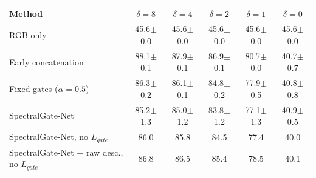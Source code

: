 \begin{tabular}{lccccc}
\toprule
Method & $\delta=8$ & $\delta=4$ & $\delta=2$ & $\delta=1$ & $\delta=0$ \\
\midrule
RGB only & 45.6$\pm$0.0 & 45.6$\pm$0.0 & 45.6$\pm$0.0 & 45.6$\pm$0.0 & 45.6$\pm$0.0 \\
Early concatenation & 88.1$\pm$0.1 & 87.9$\pm$0.1 & 86.9$\pm$0.1 & 80.7$\pm$0.0 & 40.7$\pm$0.7 \\
Fixed gates ($\alpha=0.5$) & 86.3$\pm$0.2 & 86.1$\pm$0.1 & 84.8$\pm$0.2 & 77.9$\pm$0.5 & 40.8$\pm$0.8 \\
SpectralGate-Net & 85.2$\pm$1.3 & 85.0$\pm$1.2 & 83.8$\pm$1.2 & 77.1$\pm$1.3 & 40.9$\pm$0.5 \\
SpectralGate-Net, no $L_{gate}$ & 86.0 & 85.8 & 84.5 & 77.4 & 40.0 \\
SpectralGate-Net + raw desc., no $L_{gate}$ & 86.8 & 86.5 & 85.4 & 78.5 & 40.1 \\
\bottomrule
\end{tabular}
